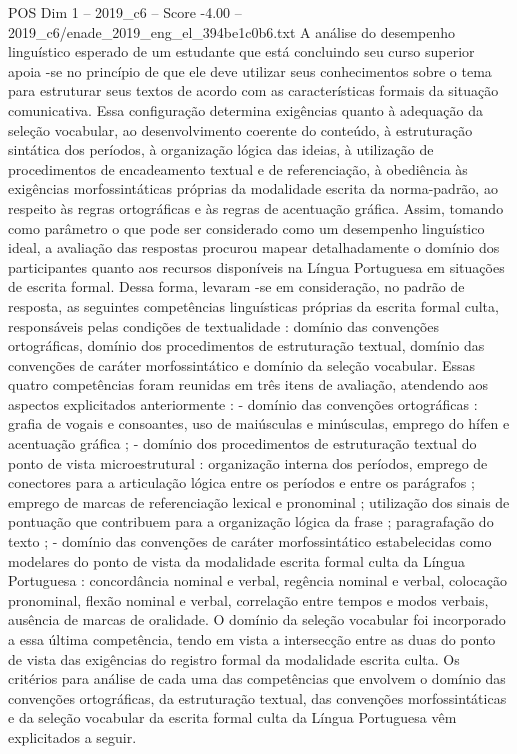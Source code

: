 \begin{textsample}{POS Dim 1 – 2019\_c6 – Score -4.00 – 2019\_c6/enade\_2019\_eng\_el\_394be1c0b6.txt}
A análise do desempenho linguístico esperado de um estudante que está concluindo seu curso superior apoia -se no princípio de que ele deve utilizar seus conhecimentos sobre o tema para estruturar seus textos de acordo com as características formais da situação comunicativa.
Essa configuração determina exigências quanto à adequação da seleção vocabular, ao desenvolvimento coerente do conteúdo, à estruturação sintática dos períodos, à organização lógica das ideias, à utilização de procedimentos de encadeamento textual e de referenciação, à obediência às exigências morfossintáticas próprias da modalidade escrita da norma-padrão, ao respeito às regras ortográficas e às regras de acentuação gráfica.
Assim, tomando como parâmetro o que pode ser considerado como um desempenho linguístico ideal, a avaliação das respostas procurou mapear detalhadamente o domínio dos participantes quanto aos recursos disponíveis na Língua Portuguesa em situações de escrita formal.
Dessa forma, levaram -se em consideração, no padrão de resposta, as seguintes competências linguísticas próprias da escrita formal culta, responsáveis pelas condições de textualidade : domínio das convenções ortográficas, domínio dos procedimentos de estruturação textual, domínio das convenções de caráter morfossintático e domínio da seleção vocabular.
Essas quatro competências foram reunidas em três itens de avaliação, atendendo aos aspectos explicitados anteriormente : - domínio das convenções ortográficas : grafia de vogais e consoantes, uso de maiúsculas e minúsculas, emprego do hífen e acentuação gráfica ; - domínio dos procedimentos de estruturação textual do ponto de vista microestrutural : organização interna dos períodos, emprego de conectores para a articulação lógica entre os períodos e entre os parágrafos ; emprego de marcas de referenciação lexical e pronominal ; utilização dos sinais de pontuação que contribuem para a organização lógica da frase ; paragrafação do texto ; - domínio das convenções de caráter morfossintático estabelecidas como modelares do ponto de vista da modalidade escrita formal culta da Língua Portuguesa : concordância nominal e verbal, regência nominal e verbal, colocação pronominal, flexão nominal e verbal, correlação entre tempos e modos verbais, ausência de marcas de oralidade.
O domínio da seleção vocabular foi incorporado a essa última competência, tendo em vista a intersecção entre as duas do ponto de vista das exigências do registro formal da modalidade escrita culta.
Os critérios para análise de cada uma das competências que envolvem o domínio das convenções ortográficas, da estruturação textual, das convenções morfossintáticas e da seleção vocabular da escrita formal culta da Língua Portuguesa vêm explicitados a seguir.

\end{textsample}
